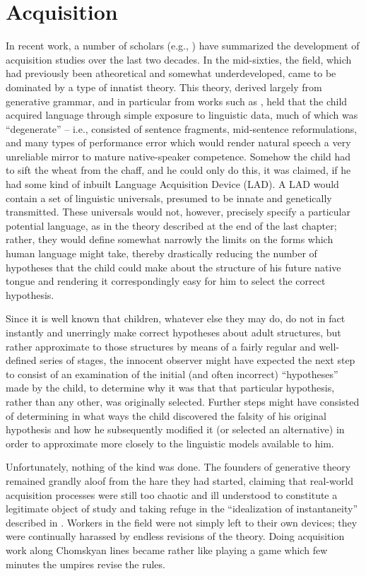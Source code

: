 \chapter{Acquisition} \label{ch:3}

In recent work, a number of scholars (e.g., \citealt{Bruner1979,Snow1979}) have summarized the development of acquisition studies over the last two decades. In the mid-sixties, the field, which had previously been atheoretical and somewhat underdeveloped, came to be dominated by a type of innatist theory. This theory, derived largely from generative grammar, and in particular from works such as \citet{Chomsky1962}, held that the child acquired language through simple exposure to linguistic data, much of which was ``degenerate'' -- i.e., consisted of sentence fragments, mid-sentence reformulations, and many types of performance error which would render natural speech a very unreliable mirror to mature native-speaker competence. Somehow the child had to sift the wheat from the chaff, and he could only do this, it was claimed, if he had some kind of inbuilt Language Acquisition Device (LAD). A LAD would contain a set of linguistic universals, presumed to be innate and genetically transmitted. These universals would not, however, precisely specify a particular potential language, as in the theory described at the end of the last chapter; rather, they would define somewhat narrowly the limits on the forms which human language might take, thereby drastically reducing the number of hypotheses that the child could make about the structure of his future native tongue and rendering it correspondingly easy for him to select the correct hypothesis.

Since it is well known that children, whatever else they may do, do not in fact instantly and unerringly make correct hypotheses about adult structures, but rather approximate to those structures by means of a fairly regular and well-defined series of stages, the innocent observer might have expected the next step to consist of an examination of the initial (and often incorrect) ``hypotheses'' made by the child, to determine why it was that that particular hypothesis, rather than any other, was originally selected. Further steps might have consisted of determining in what ways the child discovered the falsity of his original hypothesis and how he subsequently modified it (or selected an alternative) in order to approximate more closely to the linguistic models available to him.

Unfortunately, nothing of the kind was done. The founders of generative theory remained grandly aloof from the hare they had started, claiming that real-world acquisition processes were still too chaotic and ill understood to constitute a legitimate object of study and taking refuge in the ``idealization of instantaneity'' described in \cite[Chapter 7]{ChomskyEtAl1968}. Workers in the field were not simply left to their own devices; they were continually harassed by endless revisions of the theory. Doing acquisition work along Chomskyan lines became rather like playing a game which few minutes the umpires revise the rules.

